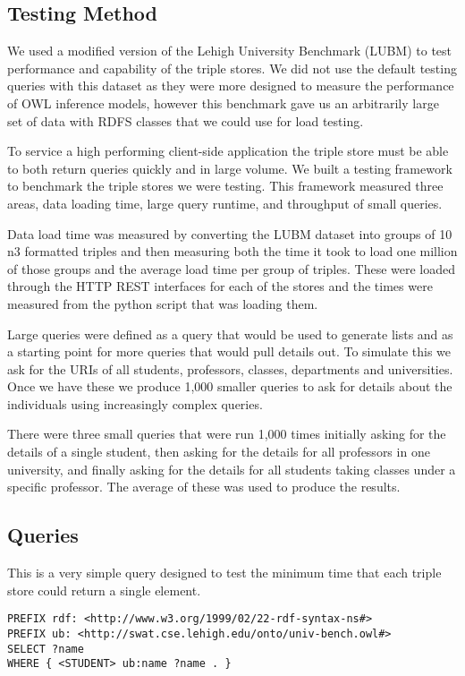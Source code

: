 \documentclass{llncs}
\begin{document}
\subsection{Testing Method}
We used a modified version of the Lehigh University Benchmark (LUBM) \cite{Guo2005} to test performance and capability of the triple stores.  We did not use the default testing queries with this dataset as they were more designed to measure the performance of OWL inference models, however this benchmark gave us an arbitrarily large set of data with RDFS classes that we could use for load testing.

To service a high performing client-side application the triple store must be able to both return queries quickly and in large volume.  We built a testing framework to benchmark the triple stores we were testing.  This framework measured three areas, data loading time, large query runtime, and throughput of small queries.

Data load time was measured by converting the LUBM dataset into groups of 10 n3 formatted triples and then measuring both the time it took to load one million of those groups and the average load time per group of triples.  These were loaded through the HTTP REST interfaces for each of the stores and the times were measured from the python script that was loading them.

Large queries were defined as a query that would be used to generate lists and as a starting point for more queries that would pull details out.  To simulate this we ask for the URIs of all students, professors, classes, departments and universities.  Once we have these we produce 1,000 smaller queries to ask for details about the individuals using increasingly complex queries.

There were three small queries that were run 1,000 times initially asking for the details of a single student, then asking for the details for all professors in one university, and finally asking for the details for all students taking classes under a specific professor.  The average of these was used to produce the results.

\subsection{Queries}
This is a very simple query designed to test the minimum time that each triple store could return a single element.

\begin{lstlisting}[caption=Benchmark Query]
PREFIX rdf: <http://www.w3.org/1999/02/22-rdf-syntax-ns#>
PREFIX ub: <http://swat.cse.lehigh.edu/onto/univ-bench.owl#>
SELECT ?name
WHERE { <STUDENT> ub:name ?name . }
\end{lstlisting}
\end{document}
